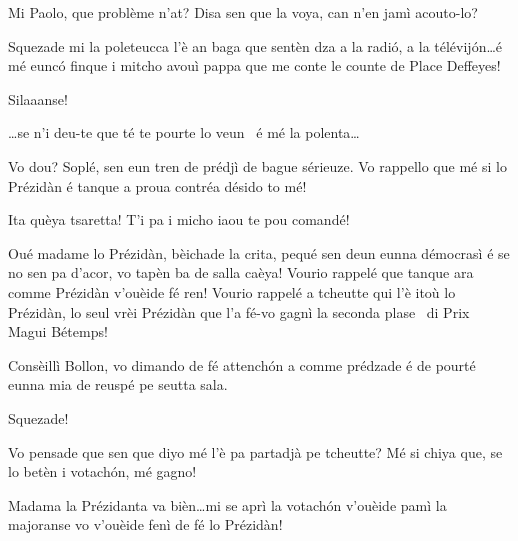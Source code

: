 \begin{drama}
\Joellespeaks Mi Paolo, que problème n'at? Disa sen que la voya, can n'en jamì acouto-lo?


\Eyviaspeaks Squezade mi la poleteucca l'è an baga que sentèn dza a la radi\'o, a la télévij\'on\ldots é mé eunc\'o finque i mitcho avouì pappa que me conte le counte de Place Deffeyes!


\Presidanspeaks{} Silaaanse! 


\Secreteospeaks \ldots se n'i deu-te que té te pourte lo veun \wine\ é mé la polenta\ldots


\Presidanspeaks Vo dou? Soplé, sen eun tren de prédjì de bague sérieuze.  Vo rappello que mé si lo Prézidàn é tanque a proua contréa désido to mé!

\Marcospeaks Ita quèya tsaretta! T'i pa i micho iaou te pou comandé!

\Jordyspeaks Oué madame lo Prézidàn, bèichade la crita, pequé sen deun eunna démocrasì é se no sen pa d'acor, vo tapèn ba de salla caèya! Vourio rappelé que tanque ara comme Prézidàn v'ou\-èi\-de fé ren! Vourio rappelé a tcheutte qui l'è itoù lo Prézidàn,  lo seul vrèi Prézidàn que l'a fé-vo gagnì la seconda plase \second\ di Prix Magui Bétemps!


\Presidanspeaks Consèillì Bollon, vo dimando de fé attench\'on a comme pré\-dzade é de pourté eunna mia de reuspé pe seutta sala.

\Jordyspeaks Squezade!

\Presidanspeaks{} Vo pensade que sen que diyo mé l'è pa partadjà pe tcheutte? Mé si chiya que, se lo betèn i votach\'on, mé gagno!


\Jordyspeaks  Madama la Prézidanta va bièn\ldots mi se aprì la votach\'on v'ou\-èi\-de pamì la majoranse vo v'ou\-è\-i\-de fenì de fé lo Prézidàn!


\end{drama}
